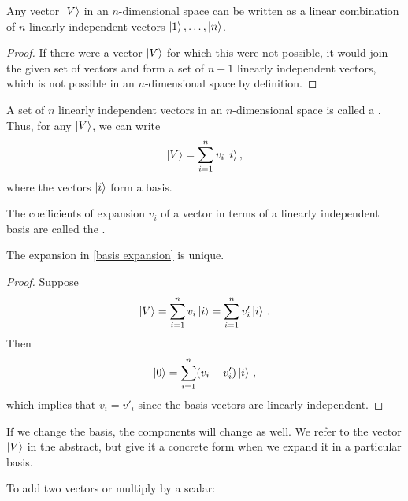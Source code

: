 \begin{theorem}\label{linear basis theorem}
Any vector $\ket{V}$ in an $n$-dimensional space can be written as a linear combination of $n$ linearly independent vectors $\ket{1}, \ldots, \ket{n}$.
\end{theorem}

\begin{proof}
If there were a vector $\ket{V}$ for which this were not possible, it would join the given set of vectors and form a set of $n + 1$ linearly independent vectors, which is not possible in an $n$-dimensional space by definition.
\end{proof}

\begin{shaded*}
A set of $n$ linearly independent vectors in an $n$-dimensional space is called a . Thus, for any $\ket{V}$, we can write
\begin{equation}\label{basis expansion}
    \ket{V} = \sum_{i = 1}^n v_i \ket{i},
\end{equation}
where the vectors $\ket{i}$ form a basis.
\end{shaded*}

The coefficients of expansion $v_i$ of a vector in terms of a linearly independent basis are called the .

\begin{theorem}\label{unique basis expansion}
The expansion in \eqref{basis expansion} is unique.
\end{theorem}

\begin{proof}
Suppose 
\begin{equation}
    \ket{V} = \sum_{i = 1}^n v_i \ket{i}
            = \sum_{i = 1}^n v'_i \ket{i}\,.
\end{equation}
Then
\begin{equation}
    \ket{0} = \sum_{i = 1}^n (v_i - v'_i) \ket{i}\,,
\end{equation}
which implies that $v_i = v'_i$ since the basis vectors are linearly independent.
\end{proof}

\begin{remark}
If we change the basis, the components will change as well. We refer to the vector $\ket{V}$ in the abstract, but give it a concrete form when we expand it in a particular basis.
\end{remark}

To add two vectors or multiply by a scalar:
\begin{center}
\end{center}

